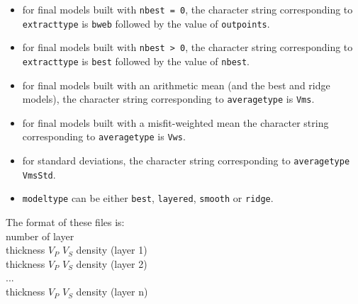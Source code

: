 \documentclass[twoside,a4paper]{article}
\begin{document}
\begin{itemize}[leftmargin=*]
\setlength\itemsep{2ex}
\item for final models built with \verb|nbest = 0|, the character string corresponding to \verb|extracttype| is \verb|bweb| followed by the value of \verb|outpoints|.

\item for final models built with \verb|nbest > 0|, the character string corresponding to \verb|extracttype| is \verb|best| followed by the value of \verb|nbest|.

\item for final models built with an arithmetic mean (and the best and ridge models), the character string corresponding to \verb|averagetype| is \verb|Vms|.

\item for final models built with a misfit-weighted mean the character string corresponding to \verb|averagetype| is \verb|Vws|.

\item for standard deviations, the character string corresponding to \verb|averagetype|  \verb|VmsStd|.

\item \verb|modeltype| can be either \verb|best|, \verb|layered|, \verb|smooth| or \verb|ridge|.
\end{itemize}
The format of these files is:\\
number of layer\\
thickness	$V_P$	$V_S$	density (layer 1)\\
thickness	$V_P$	$V_S$	density (layer 2)\\
...\\
thickness	$V_P$	$V_S$	density (layer n)
\end{document}
